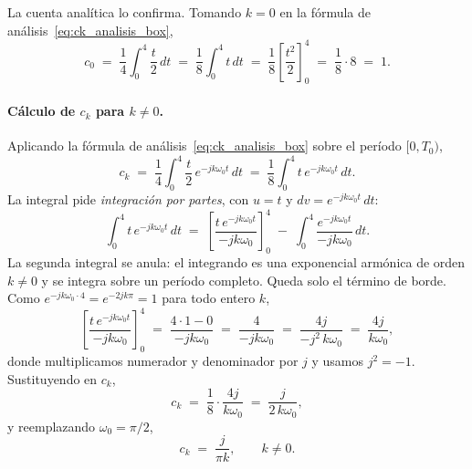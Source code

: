 \documentclass[class=book, crop=false]{standalone}
\begin{document}
La cuenta analítica lo confirma. Tomando $k=0$ en la fórmula de
análisis~\eqref{eq:ck_analisis_box},
\begin{equation*}
    c_0 \;=\; \frac{1}{4}\int_{0}^{4} \frac{t}{2}\,dt
        \;=\; \frac{1}{8}\int_{0}^{4} t\,dt
        \;=\; \frac{1}{8}\left[\frac{t^2}{2}\right]_{0}^{4}
        \;=\; \frac{1}{8}\cdot 8
        \;=\; 1.
\end{equation*}

\paragraph{Cálculo de $c_k$ para $k \neq 0$.}
Aplicando la fórmula de análisis~\eqref{eq:ck_analisis_box}
sobre el período $[0, T_0)$,
\begin{equation*}
    c_k \;=\; \frac{1}{4}\int_{0}^{4} \frac{t}{2}\,
            e^{-jk\omega_0 t}\,dt
        \;=\; \frac{1}{8}\int_{0}^{4} t\,e^{-jk\omega_0 t}\,dt.
\end{equation*}
La integral pide \emph{integración por partes}, con $u = t$ y
$dv = e^{-jk\omega_0 t}\,dt$:
\begin{equation*}
    \int_{0}^{4} t\,e^{-jk\omega_0 t}\,dt
    \;=\; \left[\frac{t\,e^{-jk\omega_0 t}}{-jk\omega_0}\right]_{0}^{4}
    \;-\; \int_{0}^{4} \frac{e^{-jk\omega_0 t}}{-jk\omega_0}\,dt.
\end{equation*}
La segunda integral se anula: el integrando es una exponencial
armónica de orden $k\neq 0$ y se integra sobre un período
completo. Queda solo el término de borde. Como
$e^{-jk\omega_0 \cdot 4} = e^{-2jk\pi} = 1$ para todo entero
$k$,
\begin{equation*}
    \left[\frac{t\,e^{-jk\omega_0 t}}{-jk\omega_0}\right]_{0}^{4}
    \;=\; \frac{4\cdot 1 - 0}{-jk\omega_0}
    \;=\; \frac{4}{-jk\omega_0}
    \;=\; \frac{4j}{-j^2\,k\omega_0}
    \;=\; \frac{4j}{k\omega_0},
\end{equation*}
donde multiplicamos numerador y denominador por $j$ y usamos
$j^2 = -1$. Sustituyendo en $c_k$,
\begin{equation*}
    c_k \;=\; \frac{1}{8}\cdot\frac{4j}{k\omega_0}
        \;=\; \frac{j}{2\,k\omega_0},
\end{equation*}
y reemplazando $\omega_0 = \pi/2$,
\begin{equation}
    c_k \;=\; \frac{j}{\pi k},
        \qquad k \neq 0.
    \label{eq:ck_sierra}
\end{equation}
\end{document}
